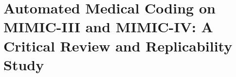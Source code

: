 
\chapter[automated medical coding on mimic-iii and mimic-iv: a critical review and replicability study]{Automated Medical Coding on MIMIC-III and MIMIC-IV: A Critical Review and Replicability Study}
\label{chp:paper-retrospective}
